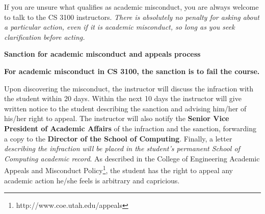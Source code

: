 \documentclass[11pt]{article}
\begin{document}
If you are unsure what qualifies as academic misconduct, you are always welcome to talk to the
CS 3100 instructors. {\em There is absolutely no penalty for asking about a particular action, even if it
is academic misconduct, so long as you seek clarification before acting.}

\vspace{.1in}
{\bf \Large Sanction for academic misconduct and appeals process
}

{\bf For academic misconduct in CS 3100, the sanction is to fail the course.}

Upon discovering the misconduct, the instructor will discuss the
infraction with the student within 20 days. Within the next 10 days
the instructor will give written notice to the student describing the
sanction and advising him/her of his/her right to appeal. The
instructor will also notify the {\bf Senior Vice President of Academic
Affairs} of the infraction and the sanction, forwarding a copy to the
{\bf Director of the School of Computing}. Finally, a letter {\em describing the
infraction will be placed in the student's permanent School of
Computing academic record}.  As described in the College of Engineering
Academic Appeals and Misconduct Policy\footnote{http://www.coe.utah.edu/appeals}, the student has the right to
appeal any academic action he/she feels is arbitrary and capricious.
\end{document}
